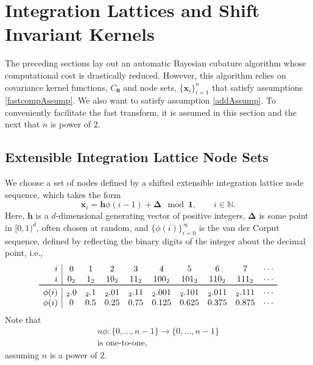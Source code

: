 \documentclass[twocolumn]{svjour3}          %
\newcommand{\bm}[1]{\boldsymbol{#1}}
\newcommand{\naturals}{\mathbb{N}}
\newcommand{\vDelta}{{\boldsymbol{\Delta}}}
\newcommand{\vtheta}{{\bm{\theta}}}
\newcommand{\vh}{\bm{h}}
\newcommand{\vx}{\bm{x}}
\newcommand{\vone}{\bm{1}}
\begin{document}
\section{Integration Lattices and Shift Invariant Kernels}
\label{sec:shift_invariant_kernel}

The preceding sections lay out an automatic Bayesian cubature algorithm whose computational cost is drastically reduced.  However, this algorithm relies on covariance kernel functions, $C_\vtheta$ and node sets, $\{\vx_i\}_{i=1}^n$ that satisfy assumptions \eqref{fastcompAssump}.  We  also want to satisfy assumption \eqref{addAssump}.  
To conveniently facilitate the fast transform, it is assumed in this section and the next that $n$ is power of $2$.  

\subsection{Extensible Integration Lattice Node Sets}

We choose a set of nodes defined by a shifted extensible integration lattice node sequence, which takes the form
\begin{equation} \label{eqn:lattice_def}
\vx_{i} = \vh \phi(i-1) + \vDelta \mod \vone, \qquad i \in \naturals.
\end{equation} 
Here, $\vh$ is a $d$-dimensional generating vector of positive integers, $\vDelta$ is some point in $[0,1)^d$, often chosen at random, and $\{\phi(i)\}_{i=0}^\infty$ is the van der Corput sequence, defined by reflecting the binary digits of the integer about the decimal point, i.e., 
\begin{align} \label{vdCDef}
\begin{array}{r|ccccccccccccc}
i & 0 & 1 & 2 & 3 & 4 &  5 & 6 & 7 & \cdots \\
i & 0_2 & 1_2 & 10_2 & 11_2 & 100_2 & 101_2 & 110_2 & 111_2  & \cdots\\
\toprule
\phi(i) & {}_2.0 &  {}_2.1 & {}_2.01 &  {}_2.11  & {}_2.001 &  {}_2.101 & {}_2.011 &  {}_2.111 & \cdots\\
\phi(i) & 0 &  0.5 &  0.25 & 0.75 &  0.125 & 0.625  &  0.375 & 0.875 & \cdots
\end{array}
\end{align}
Note that 
\begin{multline} \label{phiprop}
n\phi:\{0, \ldots, n-1 \} \to \{0, \ldots, n-1\} \\
\text{is one-to-one},
\end{multline}
assuming $n$ is a power of $2$.
\end{document}
